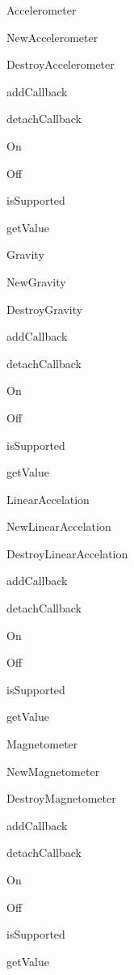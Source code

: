 \begin{DoxyItemize}
\item Accelerometer
\begin{DoxyItemize}
\item New\-Accelerometer
\item Destroy\-Accelerometer
\item add\-Callback
\item detach\-Callback
\item On
\item Off
\item is\-Supported
\item get\-Value
\end{DoxyItemize}
\item Gravity
\begin{DoxyItemize}
\item New\-Gravity
\item Destroy\-Gravity
\item add\-Callback
\item detach\-Callback
\item On
\item Off
\item is\-Supported
\item get\-Value
\end{DoxyItemize}
\item Linear\-Accelation
\begin{DoxyItemize}
\item New\-Linear\-Accelation
\item Destroy\-Linear\-Accelation
\item add\-Callback
\item detach\-Callback
\item On
\item Off
\item is\-Supported
\item get\-Value
\end{DoxyItemize}
\item Magnetometer
\begin{DoxyItemize}
\item New\-Magnetometer
\item Destroy\-Magnetometer
\item add\-Callback
\item detach\-Callback
\item On
\item Off
\item is\-Supported
\item get\-Value

\end{DoxyItemize}
\end{DoxyItemize}
